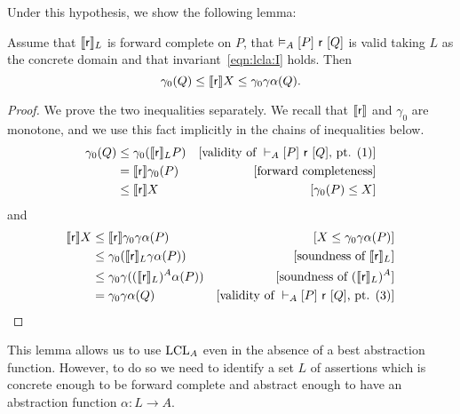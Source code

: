Under this hypothesis, we show the following lemma:

\begin{prop}
	Assume that $\llbracket\mathsf{r}\rrbracket_L$ is forward complete on $P$, that $\vDash_{A}\nobreak[P]~\mathsf{r}~[Q]$ is valid taking $L$ as the concrete domain and that invariant~\eqref{eqn:lcla:I} holds.
	Then
	\[
	\gamma_0(Q) \le \llbracket\mathsf{r}\rrbracket X \le \gamma_0\gamma\alpha(Q) \text{.}
	\]
\end{prop}
\begin{proof}
	We prove the two inequalities separately. We recall that $\llbracket\mathsf{r}\rrbracket$ and $\gamma_0$ are monotone, and we use this fact implicitly in the chains of inequalities below.
	\begin{align*}
		\gamma_0 (Q) & \le \gamma_0 (\llbracket\mathsf{r}\rrbracket_L P) & [\text{validity of }\vdash_{A}\nobreak[P]~\mathsf{r}~[Q]\text{, pt. (1)}] \\
		             & = \llbracket\mathsf{r}\rrbracket \gamma_0(P)      & [\text{forward completeness}]                             \\
		             & \le \llbracket\mathsf{r}\rrbracket X              & [\gamma_0(P) \le X]
	\end{align*}
	and
	\begin{align*}
		\llbracket\mathsf{r}\rrbracket X & \le \llbracket\mathsf{r}\rrbracket \gamma_0 \gamma \alpha(P)         & [X \le \gamma_0 \gamma \alpha(P)]                         \\
		                & \le \gamma_0 (\llbracket\mathsf{r}\rrbracket_L \gamma\alpha(P))      & [\text{soundness of }\llbracket\mathsf{r}\rrbracket_L]                     \\
		                & \le \gamma_0 \gamma ((\llbracket\mathsf{r}\rrbracket_L)^A \alpha(P)) & [\text{soundness of }(\llbracket\mathsf{r}\rrbracket_L)^A]                 \\
		                & = \gamma_0 \gamma \alpha(Q)                         & [\text{validity of }\vdash_{A}\nobreak[P]~\mathsf{r}~[Q]\text{, pt. (3)}]
	\end{align*}
\end{proof}

This lemma allows us to use $\text{LCL}_A$ even in the absence of a best abstraction function. However, to do so we need to identify a set $L$ of assertions which is concrete enough to be forward complete and abstract enough to have an abstraction function $\alpha: L \rightarrow A$.

